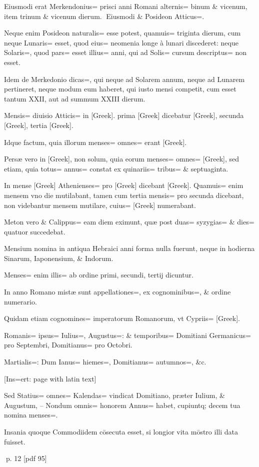 \begin{parnumbers}

Eiusmodi erat Merkendonius=  prisci anni Romani alternis= binum \& vicenum, item trinum \& vicenum dierum.
Eiusmodi \& Posideon Atticus=.

Neque enim Posideon naturalis= esse potest, quamuis= triginta dierum, cum neque Lunaris= esset, quod eius= neomenia longe à lunari discederet: neque Solaris=, quod pars= esset illius= anni, qui ad Solis= cursum descriptus= non esset.

Idem de Merkedonio dicas=, qui neque ad Solarem annum, neque ad Lunarem pertineret, neque modum eum haberet, qui iusto mensi competit, cum esset tantum XXII, aut ad summum XXIII dierum.

Mensis= diuisio Atticis= in [Greek]. prima [Greek] dicebatur [Greek], secunda [Greek], tertia [Greek].

Idque factum, quia illorum menses= omnes= erant [Greek].

Persæ vero in [Greek],  non solum, quia eorum menses= omnes= [Greek], sed etiam, quia totus= annus= constat ex quinariis= tribus= \& septuaginta.

In mense [Greek] Athenienses= pro [Greek] dicebant [Greek]. Quamuis= enim mensem vno die mutilabant, tamen cum tertia mensis= pro secunda dicebant, non videbantur mensem mutilare, cuius= [Greek] numerabant.

Meton vero \& Calippus= eam diem eximunt, quæ post duas= syzygias= \& dies= quatuor succedebat.

Mensium nomina in antiqua Hebraici anni forma nulla fuerunt, neque in hodierna Sinarum, Iaponensium, \& Indorum.

Menses= enim illis= ab ordine primi, secundi, tertij dicuntur.

In anno Romano mistæ sunt appellationes=, ex cognominibus=, \& ordine numerario.

Quidam etiam cognomines= imperatorum Romanorum, vt Cypriis= [Greek].

Romanis= ipsus= Iulius=, Augustus=: \& temporibus= Domitiani Germanicus= pro Septembri, Domitianus= pro Octobri.

Martialis=: Dum Ianus= hiemes=, Domitianus= autumnos=, \&c.

[Ins=ert: page with latin text]

Sed Statius= omnes= Kalendas= vindicat Domitiano, præter Iulium, \& Augustum, – Nondum omnis= honorem Annus= habet, cupiuntq; decem tua nomina menses=.

Insania quoque Commodiidem cōsecuta esset, si  longior vita mōstro illi data fuisset.

\end{parnumbers}
\clearpage
p. 12 [pdf 95]

